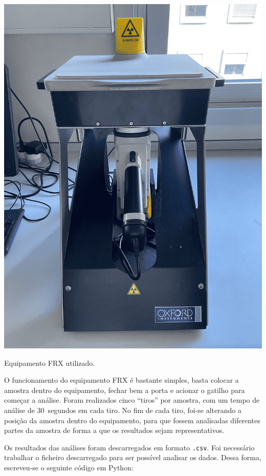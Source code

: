 \begin{marginfigure}[1\baselineskip]
    \centering
    \includegraphics[width=0.7\linewidth]{figures/FRX}
    \caption{Equipamento FRX utilizado.}
    \label{fig:equipamento_frx}
\end{marginfigure}

O funcionamento do equipamento FRX é bastante simples, basta colocar a amostra dentro do equipamento, fechar bem a porta e acionar o gatilho para começar a análise.
Foram realizados cinco ``tiros'' por amostra, com um tempo de análise de 30~segundos em cada tiro.
No fim de cada tiro, foi-se alterando a posição da amostra dentro do equipamento, para que fossem analisadas diferentes partes da amostra de forma a que os resultados sejam representativos.

Os resultados das análises foram descarregados em formato \texttt{.csv}.
Foi necessário trabalhar o ficheiro descarregado para ser possível analisar os dados.
Dessa forma, escreveu-se o seguinte código em Python:


